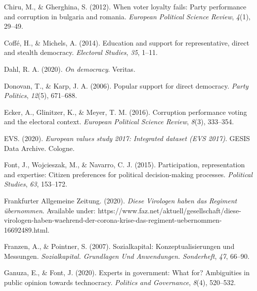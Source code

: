 \documentclass[
  12pt,
  english,
]{article}
\newlength{\cslhangindent}
\newlength{\cslentryspacingunit} %
\newenvironment{CSLReferences}[2] %
 {%
  \setlength{\parindent}{0pt}
  \ifodd #1
  \let\oldpar\par
  \def\par{\hangindent=\cslhangindent\oldpar}
  \fi
  \setlength{\parskip}{#2\cslentryspacingunit}
 }%
 {}
\begin{document}
\begin{CSLReferences}{1}{0}
\leavevmode{}%
Chiru, M., \& Gherghina, S. (2012). When voter loyalty fails: Party
performance and corruption in bulgaria and romania. \emph{European
Political Science Review}, \emph{4}(1), 29--49.

\leavevmode{}%
Coffé, H., \& Michels, A. (2014). Education and support for
representative, direct and stealth democracy. \emph{Electoral Studies},
\emph{35}, 1--11.

\leavevmode{}%
Dahl, R. A. (2020). \emph{On democracy}. Veritas.

\leavevmode{}%
Donovan, T., \& Karp, J. A. (2006). Popular support for direct
democracy. \emph{Party Politics}, \emph{12}(5), 671--688.

\leavevmode{}%
Ecker, A., Glinitzer, K., \& Meyer, T. M. (2016). Corruption performance
voting and the electoral context. \emph{European Political Science
Review}, \emph{8}(3), 333--354.

\leavevmode{}%
EVS. (2020). \emph{European values study 2017: Integrated dataset (EVS
2017)}. GESIS Data Archive. Cologne.

\leavevmode{}%
Font, J., Wojcieszak, M., \& Navarro, C. J. (2015). Participation,
representation and expertise: Citizen preferences for political
decision-making processes. \emph{Political Studies}, \emph{63},
153--172.

\leavevmode{}%
Frankfurter Allgemeine Zeitung. (2020). \emph{{Diese Virologen haben das
Regiment übernommen}}. Available under:
https://www.faz.net/aktuell/gesellschaft/diese-virologen-haben-waehrend-der-corona-krise-das-regiment-uebernommen-16692489.html.

\leavevmode{}%
Franzen, A., \& Pointner, S. (2007). {Sozialkapital:
Konzeptualisierungen und Messungen}. \emph{{Sozialkapital. Grundlagen
Und Anwendungen. Sonderheft}}, \emph{47}, 66--90.

\leavevmode{}%
Ganuza, E., \& Font, J. (2020). Experts in government: What for?
Ambiguities in public opinion towards technocracy. \emph{Politics and
Governance}, \emph{8}(4), 520--532.


\end{CSLReferences}
\end{document}
